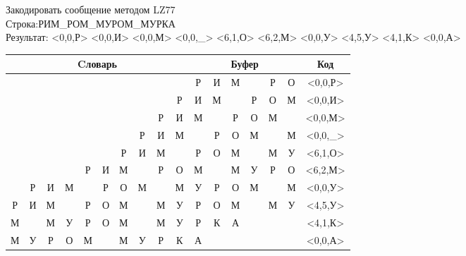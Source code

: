 \documentclass[a4paper, 12pt]{article}
\begin{document}
Закодировать сообщение методом LZ77\\
Строка:РИМ\_РОМ\_МУРОМ\_МУРКА\\
Результат: <0,0,Р> <0,0,И> <0,0,М> <0,0,\_> <6,1,О> <6,2,М> <0,0,У> <4,5,У> <4,1,К> <0,0,А>\\
\begin{table}[h!]
\centering
\begin{tabular}{|c|c|c|c|c|c|c|c|c|c|c|c|c|c|c|c|c|} 
\hline
\multicolumn{10}{|c|}{Cловарь} & \multicolumn{6}{c|}{Буфер} & Код  \\ \hline
  &   &   &   &   &   &   &   &   &   & \cellcolor[HTML]{8CE4F6} Р & И & М &   & Р & О & <0,0,Р>
\\ \hline
  &   &   &   &   &   &   &   &   & Р & \cellcolor[HTML]{8CE4F6} И & М &   & Р & О & М & <0,0,И>
\\ \hline
  &   &   &   &   &   &   &   & Р & И & \cellcolor[HTML]{8CE4F6} М &   & Р & О & М &   & <0,0,М>
\\ \hline
  &   &   &   &   &   &   & Р & И & М & \cellcolor[HTML]{8CE4F6}   & Р & О & М &   & М & <0,0,\_>
\\ \hline
  &   &   &   &   &   & \cellcolor[HTML]{FFFF00} Р & И & М &   & \cellcolor[HTML]{FFFF00} Р & \cellcolor[HTML]{8CE4F6} О & М &   & М & У & <6,1,О>
\\ \hline
  &   &   &   & Р & И & \cellcolor[HTML]{FFFF00} М & \cellcolor[HTML]{FFFF00}   & Р & О & \cellcolor[HTML]{FFFF00} М & \cellcolor[HTML]{FFFF00}   & \cellcolor[HTML]{8CE4F6} М & У & Р & О & <6,2,М>
\\ \hline
  & Р & И & М &   & Р & О & М &   & М & \cellcolor[HTML]{8CE4F6} У & Р & О & М &   & М & <0,0,У>
\\ \hline
Р & И & М &   & \cellcolor[HTML]{FFFF00} Р & \cellcolor[HTML]{FFFF00} О & \cellcolor[HTML]{FFFF00} М & \cellcolor[HTML]{FFFF00}   & \cellcolor[HTML]{FFFF00} М & У & \cellcolor[HTML]{FFFF00} Р & \cellcolor[HTML]{FFFF00} О & \cellcolor[HTML]{FFFF00} М & \cellcolor[HTML]{FFFF00}   & \cellcolor[HTML]{FFFF00} М & \cellcolor[HTML]{8CE4F6} У & <4,5,У>
\\ \hline
М &   & М & У & \cellcolor[HTML]{FFFF00} Р & О & М &   & М & У & \cellcolor[HTML]{FFFF00} Р & \cellcolor[HTML]{8CE4F6} К & А &   &   &   & <4,1,К>
\\ \hline
М & У & Р & О & М &   & М & У & Р & К & \cellcolor[HTML]{8CE4F6} А &   &   &   &   &   & <0,0,А>
\\ \hline
\end{tabular}
\end{table}
\end{document}
